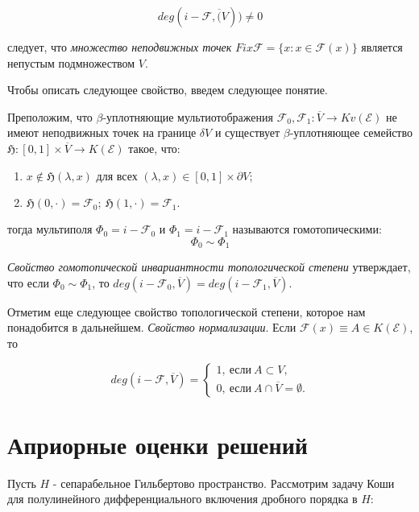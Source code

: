 $$deg(i - \mathcal{F}, \overline(V)) \neq 0$$

\noindent следует, что \textit{множество неподвижных точек} $Fix\mathcal{F} = \{x: x \in \mathcal{F}(x)\}$ является непустым подмножеством $V$.

Чтобы описать следующее свойство, введем следующее понятие.

\begin{definition}
    Преположим, что $\beta$-уплотняющие мультиотображения $\mathcal{F}_0, \mathcal{F}_1: \overline{V} \rightarrow Kv(\mathcal{E})$
    не имеют неподвижных точек на границе $\delta V$ и существует $\beta$-уплотняющее семейство
    $\mathfrak{H}: [0, 1] \times \overline{V} \rightarrow K(\mathcal{E})$ такое, что:
    \begin{enumerate}
        \item $x \notin \mathfrak{H}(\lambda, x)$ для всех $(\lambda, x) \in [0, 1] \times \partial V$;
        \item $\mathfrak{H}(0, \cdot{}) = \mathcal{F}_0; \ \mathfrak{H}(1, \cdot{}) = \mathcal{F}_1.$
    \end{enumerate}
    тогда мультиполя $\Phi_0 = i - \mathcal{F}_0$ и $\Phi_1 = i - \mathcal{F}_1$ называются гомотопическими:
    $$\Phi_0 \sim \Phi_1$$
\end{definition}

\textit{Свойство гомотопической инвариантности топологической степени} утверждает, что если $\Phi_0 \sim \Phi_1$, то
$deg(i - \mathcal{F}_0, \overline{V}) = deg(i - \mathcal{F}_1, \overline{V})$.

Отметим еще следующее свойство топологической степени, которое нам понадобится в дальнейшем. \textit{Свойство нормализации}.
Если $\mathcal{F}(x) \equiv A \in K(\mathcal{E})$, то

\begin{equation*}
    deg(i - \mathcal{F}, \overline{V}) = 
    \begin{cases}
        1, \ \text{если} \ A \subset V, \\
        0, \ \text{если} \ A \cap \overline{V} = \emptyset.
    \end{cases}
\end{equation*}

\section{Априорные оценки решений}

Пусть $H$ - сепарабельное Гильбертово пространство. Рассмотрим задачу Коши для полулинейного дифференциального включения
дробного порядка в $H$:

